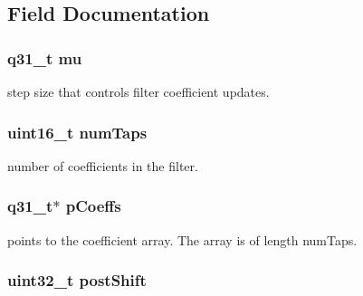 \subsection{Field Documentation}
\hypertarget{structarm__lms__instance__q31_a21ab4237a726ea7751f5026d89d2e577}{
\subsubsection[{mu}]{\setlength{\rightskip}{0pt plus 5cm}q31\-\_\-t mu}}\label{structarm__lms__instance__q31_a21ab4237a726ea7751f5026d89d2e577}
step size that controls filter coefficient updates. \hypertarget{structarm__lms__instance__q31_a751941891e47f522a7f5375fe8990aac}{
\subsubsection[{num\-Taps}]{\setlength{\rightskip}{0pt plus 5cm}uint16\-\_\-t num\-Taps}}\label{structarm__lms__instance__q31_a751941891e47f522a7f5375fe8990aac}
number of coefficients in the filter. \hypertarget{structarm__lms__instance__q31_a68888e36167d81cb7836db10367a1682}{
\subsubsection[{p\-Coeffs}]{\setlength{\rightskip}{0pt plus 5cm}q31\-\_\-t$\ast$ p\-Coeffs}}\label{structarm__lms__instance__q31_a68888e36167d81cb7836db10367a1682}
points to the coefficient array. The array is of length num\-Taps. \hypertarget{structarm__lms__instance__q31_aa2cacddfc5e1d86905d7d31a18b1979b}{
\subsubsection[{post\-Shift}]{\setlength{\rightskip}{0pt plus 5cm}uint32\-\_\-t post\-Shift}}\label{structarm__lms__instance__q31_aa2cacddfc5e1d86905d7d31a18b1979b}

